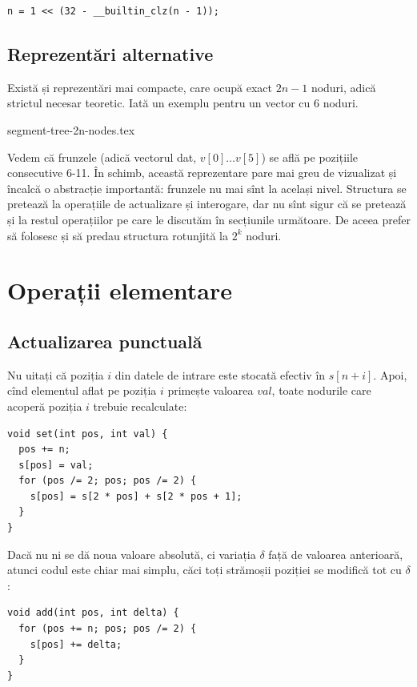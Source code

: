 \documentclass[../main.tex]{subfiles}
\begin{document}
\begin{verbatim}
n = 1 << (32 - __builtin_clz(n - 1));
\end{verbatim}

\subsection{Reprezentări alternative}

Există și reprezentări mai compacte, care ocupă exact $2n-1$ noduri, adică strictul necesar teoretic. Iată un exemplu pentru un vector cu 6 noduri.

{segment-tree-2n-nodes.tex}

Vedem că frunzele (adică vectorul dat, $v[0] \dots v[5]$) se află pe pozițiile consecutive 6-11. În schimb, această reprezentare pare mai greu de vizualizat și încalcă o abstracție importantă: frunzele nu mai sînt la același nivel. Structura se pretează la operațiile de actualizare și interogare, dar nu sînt sigur că se pretează și la restul operațiilor pe care le discutăm în secțiunile următoare. De aceea prefer să folosesc și să predau structura rotunjită la $2^k$ noduri.

\section{Operații elementare}

\subsection{Actualizarea punctuală}

Nu uitați că poziția $i$ din datele de intrare este stocată efectiv în $s[n + i]$. Apoi, cînd elementul aflat pe poziția $i$ primește valoarea $val$, toate nodurile care acoperă poziția $i$ trebuie recalculate:

\begin{verbatim}
void set(int pos, int val) {
  pos += n;
  s[pos] = val;
  for (pos /= 2; pos; pos /= 2) {
    s[pos] = s[2 * pos] + s[2 * pos + 1];
  }
}
\end{verbatim}

Dacă nu ni se dă noua valoare absolută, ci variația $\delta$ față de valoarea anterioară, atunci codul este chiar mai simplu, căci toți strămoșii poziției se modifică tot cu $\delta$:

\begin{verbatim}
void add(int pos, int delta) {
  for (pos += n; pos; pos /= 2) {
    s[pos] += delta;
  }
}
\end{verbatim}
\end{document}
